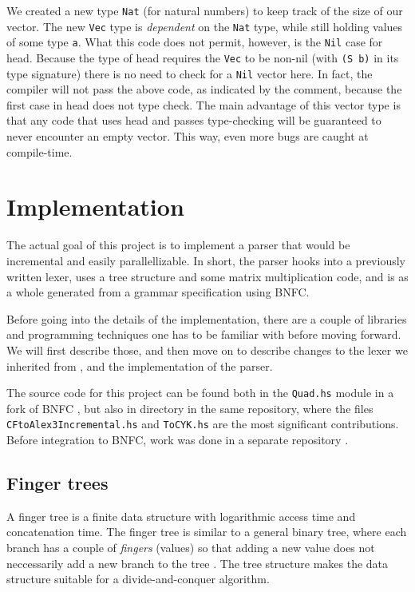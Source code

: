 \documentclass[a4paper,12pt,notitlepage]{report}
\renewcommand\cite{\citep}
\begin{document}
We created a new type \texttt{Nat} (for natural numbers) to keep track of the
size of our vector. The new \texttt{Vec} type is \textit{dependent} on the
\texttt{Nat} type, while still holding values of some type \texttt{a}. What this
code does not permit, however, is the \texttt{Nil} case for head. Because the
type of head requires the \texttt{Vec} to be non-nil (with \texttt{(S b)} in its
type signature) there is no need to check for a \texttt{Nil} vector here. In
fact, the compiler will not pass the above code, as indicated by the comment,
because the first case in head does not type check. The main advantage of this
vector type is that any code that uses head and passes type-checking will be
guaranteed to never encounter an empty vector.  This way, even more bugs are
caught at compile-time.

%
%

\chapter{Implementation}
The actual goal of this project is to implement a parser that would be
incremental and easily parallellizable. In short, the parser hooks into a
previously written lexer, uses a tree structure and some matrix multiplication
code, and is as a whole generated from a grammar specification using BNFC.

Before going into the details of the implementation, there are a
couple of libraries and programming techniques one has to be familiar with
before moving forward. We will first describe those, and then move on to
describe changes to the lexer we inherited from \citet{divconqlex}, and the
implementation of the parser.

The source code for this project can be found both in the \texttt{Quad.hs}
module in a fork of BNFC \cite{jyp-bnfc}, but also in
 directory in the same repository, where
the files \texttt{CFtoAlex3Incremental.hs} and \texttt{ToCYK.hs} are the most
significant contributions. Before integration to BNFC, work was done in a
separate repository \cite{tobsan-repo}.

\section{Finger trees}
A finger tree is a finite data structure with logarithmic access time and
concatenation time. The finger tree is similar to a general binary tree, where each
branch has a couple of \textit{fingers} (values) so that adding a new value does
not neccessarily add a new branch to the tree \cite{fingertrees}. The tree
structure makes the data structure suitable for a divide-and-conquer algorithm.
\end{document}

